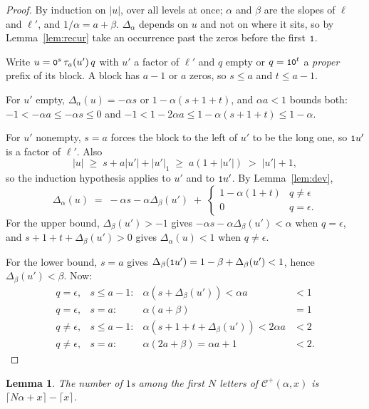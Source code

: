 \documentclass[11pt,a4paper]{article}
\newcommand{\seq}[1]{\texttt{\small #1}}
\newcommand{\Cp}{\mathcal{C}^{+}}
\theoremstyle{definition}
\theoremstyle{plain}
\newtheorem{lemma}[definition]{Lemma}
\begin{document}
\begin{proof}
By induction on $\lvert u\rvert$, over all levels at once; $\alpha$ and $\beta$
are the slopes of $\ell$ and $\ell'$, and $1/\alpha = a + \beta$.
$\Delta_\alpha$ depends on $u$ and not on where it sits, so by
Lemma~\ref{lem:recur} take an occurrence past the zeros before the first
$\seq{1}$.

Write $u = \seq{0}^s\,\tau_a(u')\,q$ with $u'$ a factor of $\ell'$ and $q$ empty
or $q = \seq{1}\seq{0}^t$ a \emph{proper} prefix of its block. A block has
$a-1$ or $a$ zeros, so $s \leq a$ and $t \leq a-1$.

For $u'$ empty, $\Delta_\alpha(u) = -\alpha s$ or $1 - \alpha(s+1+t)$, and
$\alpha a < 1$ bounds both: $-1 < -\alpha a \leq -\alpha s \leq 0$ and
$-1 < 1 - 2\alpha a \leq 1 - \alpha(s+1+t) \leq 1-\alpha$.

For $u'$ nonempty, $s = a$ forces the block to the left of $u'$ to be the long
one, so $\seq{1}u'$ is a factor of $\ell'$. Also
\[
  \lvert u\rvert \;\geq\; s + a\lvert u'\rvert + \lvert u'\rvert_1
  \;\geq\; a(1 + \lvert u'\rvert) \;>\; \lvert u'\rvert + 1 ,
\]
so the induction hypothesis applies to $u'$ and to $\seq{1}u'$. By
Lemma~\ref{lem:dev},
\[
  \Delta_\alpha(u) \;=\; -\alpha s - \alpha\Delta_\beta(u')
  \;+\; \begin{cases} 1 - \alpha(1+t) & q \neq \epsilon \\ 0 & q = \epsilon .\end{cases}
\]
For the upper bound, $\Delta_\beta(u') > -1$ gives $-\alpha s -
\alpha\Delta_\beta(u') < \alpha$ when $q = \epsilon$, and $s + 1 + t +
\Delta_\beta(u') > 0$ gives $\Delta_\alpha(u) < 1$ when $q \neq \epsilon$.

For the lower bound, $s = a$ gives $\Delta_\beta(\seq{1}u') = 1 - \beta +
\Delta_\beta(u') < 1$, hence $\Delta_\beta(u') < \beta$. Now:
\[
  \begin{array}{llll}
    q = \epsilon, & s \leq a-1: & \alpha(s + \Delta_\beta(u')) < \alpha a & < 1 \\
    q = \epsilon, & s = a: & \alpha(a + \beta) & = 1 \\
    q \neq \epsilon, & s \leq a-1: & \alpha(s+1+t+\Delta_\beta(u')) < 2\alpha a & < 2 \\
    q \neq \epsilon, & s = a: & \alpha(2a + \beta) = \alpha a + 1 & < 2 .
  \end{array}
\]
\end{proof}

\begin{lemma}\label{lem:countup}
The number of $1$s among the first $N$ letters of $\Cp(\alpha,x)$ is
$\lceil N\alpha + x\rceil - \lceil x \rceil$.
\end{lemma}
\end{document}
